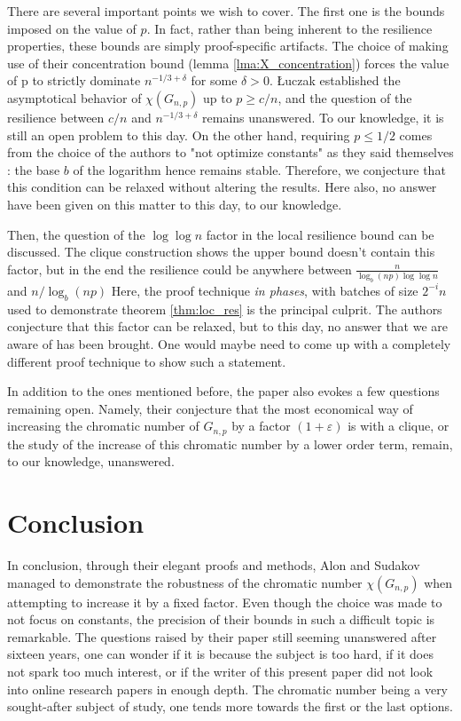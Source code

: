 \documentclass[10pt,journal,a4paper]{IEEEtran}
\theoremstyle{definition}   %
\begin{document}
There are several important points we wish to cover. The first one is the bounds imposed on the value of $p$. In fact, rather than being inherent to the resilience properties, these bounds are simply proof-specific artifacts. The choice of making use of their concentration bound (lemma \ref{lma:X_concentration}) forces the value of p to strictly dominate $n^{-1 / 3 + \delta}$ for some $\delta > 0$. \L{}uczak established the asymptotical behavior of $\chi(G_{n, p})$ up to $p \ge c / n$, and the question of the resilience between $c / n$ and $n^{-1 / 3 + \delta}$ remains unanswered. To our knowledge, it is still an open problem to this day. On the other hand, requiring $p \leq 1 / 2$ comes from the choice of the authors to "not optimize constants" as they said themselves : the base $b$ of the logarithm hence remains stable. Therefore, we conjecture that this condition can be relaxed without altering the results. Here also, no answer have been given on this matter to this day, to our knowledge.

Then, the question of the $\log \log n$ factor in the local resilience bound can be discussed. The clique construction shows the upper bound doesn't contain this factor, but in the end the resilience could be anywhere between $\frac{n}{\log_b (np) \log \log n}$ and $n / \log_b (np)$ Here, the proof technique \textit{in phases}, with batches of size $2^{-i}n$ used to demonstrate theorem \ref{thm:loc_res} is the principal culprit. The authors conjecture that this factor can be relaxed, but to this day, no answer that we are aware of has been brought. One would maybe need to come up with a completely different proof technique to show such a statement.

In addition to the ones mentioned before, the paper also evokes a few questions remaining open. Namely, their conjecture that the most economical way of increasing the chromatic number of $G_{n, p}$ by a factor $(1+\varepsilon)$ is with a clique, or the study of the increase of this chromatic number by a lower order term, remain, to our knowledge, unanswered.

\section{Conclusion}

In conclusion, through their elegant proofs and methods, Alon and Sudakov managed to demonstrate the robustness of the chromatic number $\chi(G_{n, p})$ when attempting to increase it by a fixed factor. Even though the choice was made to not focus on constants, the precision of their bounds in such a difficult topic is remarkable. The questions raised by their paper still seeming unanswered after sixteen years, one can wonder if it is because the subject is too hard, if it does not spark too much interest, or if the writer of this present paper did not look into online research papers in enough depth. The chromatic number being a very sought-after subject of study, one tends more towards the first or the last options.
\end{document}
